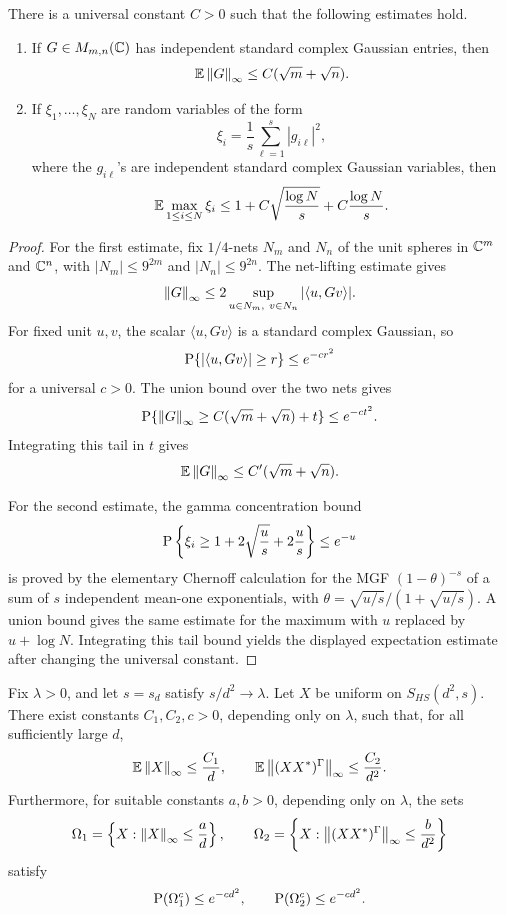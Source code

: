 \begin{lemma}
\label{lem:standard_gaussian_gamma_estimates}
There is a universal constant \(C>0\) such that the following estimates hold.
\begin{enumerate}
    \item If \(G\in M_{m,n}(\mathbb{C})\) has independent standard complex Gaussian
    entries, then
    \[
        \operatorname{\mathbb{E}}\left\lVert G\right\rVert_\infty\le C(\sqrt m+\sqrt n).
    \]
    \item If \(\xi_1,\ldots,\xi_N\) are random variables of the form
    \[
        \xi_i=\frac1s\sum_{\ell=1}^s |g_{i\ell}|^2,
    \]
    where the \(g_{i\ell}\)'s are independent standard complex Gaussian
    variables, then
    \[
        \operatorname{\mathbb{E}}\max_{1\le i\le N}\xi_i
        \le
        1+C\sqrt{\frac{\log N}{s}}+C\frac{\log N}{s}.
    \]
\end{enumerate}
\end{lemma}

\begin{proof}
For the first estimate, fix \(1/4\)-nets \(N_m\) and \(N_n\) of the unit
spheres in \(\mathbb{C}^m\) and \(\mathbb{C}^n\), with \(|N_m|\le 9^{2m}\) and
\(|N_n|\le 9^{2n}\).  The net-lifting estimate gives
\[
    \left\lVert G\right\rVert_\infty\le 2\sup_{u\in N_m,\ v\in N_n}|\langle u,Gv\rangle|.
\]
For fixed unit \(u,v\), the scalar \(\langle u,Gv\rangle\) is a standard
complex Gaussian, so
\[
    \operatorname{P}\{|\langle u,Gv\rangle|\ge r\}\le e^{-cr^2}
\]
for a universal \(c>0\).  The union bound over the two nets gives
\[
    \operatorname{P}\{\left\lVert G\right\rVert_\infty\ge C(\sqrt m+\sqrt n)+t\}\le e^{-ct^2}.
\]
Integrating this tail in \(t\) gives
\[
    \operatorname{\mathbb{E}}\left\lVert G\right\rVert_\infty\le C'(\sqrt m+\sqrt n).
\]

For the second estimate, the gamma concentration bound
\[
    \operatorname{P}\left\{\xi_i\ge 1+2\sqrt{\frac u s}+2\frac u s\right\}\le e^{-u}
\]
is proved by the elementary Chernoff calculation for the MGF
\((1-\theta)^{-s}\) of a sum of \(s\) independent mean-one exponentials, with
\(\theta=\sqrt{u/s}/(1+\sqrt{u/s})\).  A union bound gives the same estimate for the
maximum with \(u\) replaced by \(u+\log N\).  Integrating this tail bound yields
the displayed expectation estimate after changing the universal constant.
\end{proof}

\begin{lemma}
\label{lem:normalized_operator_norm_inputs}
Fix \(\lambda>0\), and let \(s=s_d\) satisfy \(s/d^2\to\lambda\).  Let \(X\)
be uniform on \(S_{HS}(d^2,s)\).  There exist constants \(C_1,C_2,c>0\),
depending only on \(\lambda\), such that, for all sufficiently large \(d\),
\[
    \operatorname{\mathbb{E}}\left\lVert X\right\rVert_\infty\le \frac{C_1}{d},
    \qquad
    \operatorname{\mathbb{E}}\left\lVert(XX^*)^\Gamma\right\rVert_\infty\le \frac{C_2}{d^2}.
\]
Furthermore, for suitable constants \(a,b>0\), depending only on \(\lambda\),
the sets
\[
    \Omega_1=\left\{X:\left\lVert X\right\rVert_\infty\le \frac{a}{d}\right\},
    \qquad
    \Omega_2=\left\{X:\left\lVert(XX^*)^\Gamma\right\rVert_\infty\le \frac{b}{d^2}\right\}
\]
satisfy
\[
    \operatorname{P}(\Omega_1^c)\le e^{-cd^2},
    \qquad
    \operatorname{P}(\Omega_2^c)\le e^{-cd^2}.
\]
\end{lemma}

